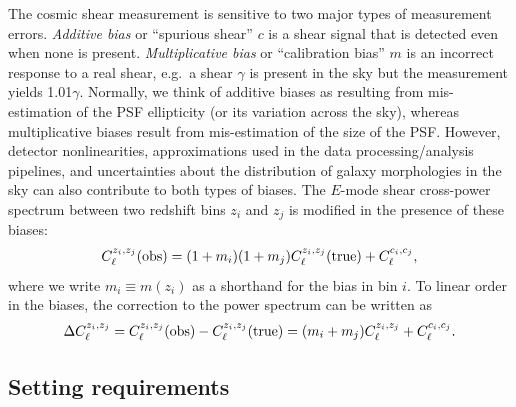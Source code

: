 \documentclass[aps,prd, amsmath,amssymb,superscriptaddress,showkeys,nofootinbib,reprint,preprintnumbers]{revtex4-1}
\begin{document}
\begin{widetext}
The cosmic shear measurement is sensitive to two major types of
measurement errors. {\em Additive bias} or ``spurious shear'' $c$ is a
shear signal that is detected even when none is present. {\em
Multiplicative bias} or ``calibration bias'' $m$ is an incorrect response
to a real shear, e.g.\ a shear $\gamma$ is present in the sky but the
measurement yields 1.01$\gamma$. Normally, we think of additive biases
as resulting from mis-estimation of the PSF ellipticity (or its
variation across the sky), whereas multiplicative biases result from
mis-estimation of the size of the PSF. However, detector
nonlinearities, approximations used in the data processing/analysis
pipelines, and uncertainties about the distribution of galaxy
morphologies in the sky can also contribute to both types of
biases.  The $E$-mode
shear cross-power spectrum between two redshift bins $z_i$ and $z_j$
is modified in the presence of these biases:
\begin{equation}
C_\ell^{z_i,z_j}({\rm obs}) = (1+m_i)(1+m_j)C_\ell^{z_i,z_j}({\rm true}) + C_\ell^{c_i,c_j},
\label{eq:mod}
\end{equation}
where we write $m_i\equiv m(z_i)$ as a shorthand for the bias in bin $i$. To linear order in
the biases, the correction to the power spectrum can be written as
\begin{equation}
\Delta C_\ell^{z_i,z_j} = C_\ell^{z_i,z_j}({\rm obs}) - C_\ell^{z_i,z_j}({\rm true}) = (m_i+m_j)C_\ell^{z_i,z_j}+C_\ell^{c_i,c_j}.
\label{eq:Delta C}
\end{equation}

\subsection{Setting requirements}


\end{widetext}
\end{document}
